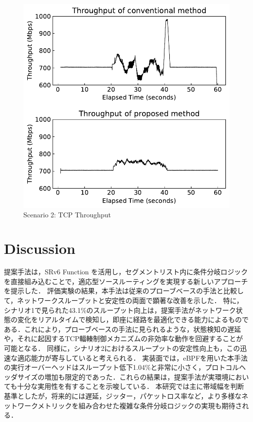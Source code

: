 \documentclass[conference]{IEEEtran}
\begin{document}
\begin{figure}[t]
  \centering
  \includegraphics[width=0.7\linewidth]{./figures/scenario-2.pdf}
  \caption{Scenario 2: TCP Throughput}
  \label{fig:scenario-2}
\end{figure}


\section{Discussion}

提案手法は，SRv6 Function を活用し，セグメントリスト内に条件分岐ロジックを直接組み込むことで，適応型ソースルーティングを実現する新しいアプローチを提示した．
評価実験の結果，本手法は従来のプローブベースの手法と比較して，ネットワークスループットと安定性の両面で顕著な改善を示した．
特に，シナリオ1で見られた43.1\%のスループット向上は，提案手法がネットワーク状態の変化をリアルタイムで検知し，即座に経路を最適化できる能力によるものである．これにより，プローブベースの手法に見られるような，状態検知の遅延や，それに起因するTCP輻輳制御メカニズムの非効率な動作を回避することが可能となる．
同様に，シナリオ2におけるスループットの安定性向上も，この迅速な適応能力が寄与していると考えられる．
実装面では，eBPFを用いた本手法の実行オーバーヘッドはスループット低下1.04\%と非常に小さく，プロトコルヘッダサイズの増加も限定的であった．これらの結果は，提案手法が実環境においても十分な実用性を有することを示唆している．
本研究では主に帯域幅を判断基準としたが，将来的には遅延，ジッター，パケットロス率など，より多様なネットワークメトリックを組み合わせた複雑な条件分岐ロジックの実現も期待される．
\end{document}
